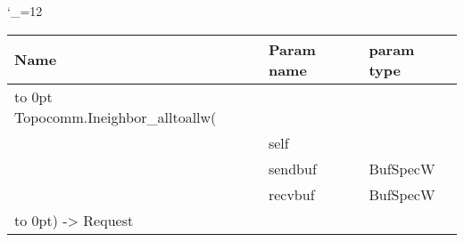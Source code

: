 \begingroup \catcode`\_=12 \tt
\begin{tabular}{lll}
\toprule
\textrm{Name}&\textrm{Param name}&\textrm{param type}\\
\midrule
\hbox to 0pt {Topocomm.Ineighbor_alltoallw(\hss}\\
& self\\
& sendbuf & BufSpecW\\
& recvbuf & BufSpecW\\
\hbox to 0pt{) -> Request\hss}\\
\bottomrule
\end{tabular}
\endgroup

